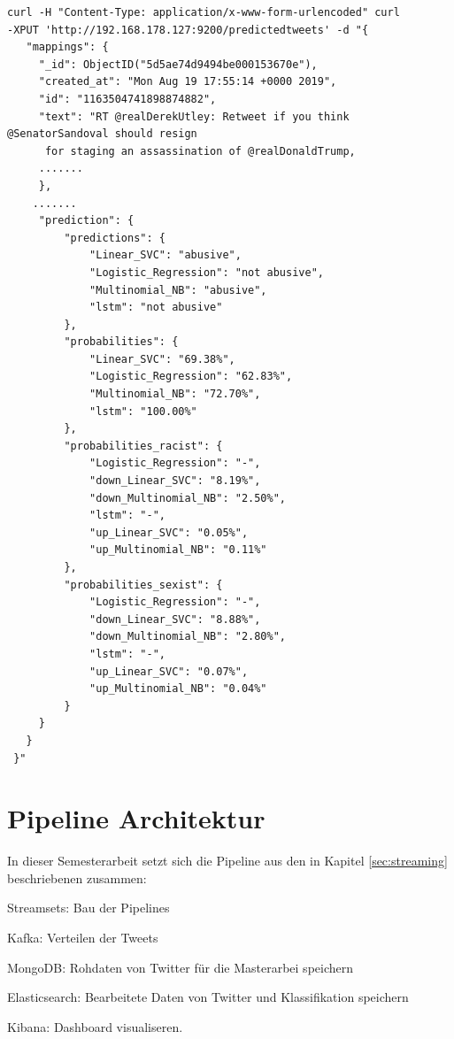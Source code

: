 \begin{lstlisting}[float=h,frame=tb,caption={Befehl ein Dokument in Elasticsearch einzufügen},label=lst:elastic_creat_doc]
curl -H "Content-Type: application/x-www-form-urlencoded" curl 
-XPUT 'http://192.168.178.127:9200/predictedtweets' -d "{
   "mappings": {
     "_id": ObjectID("5d5ae74d9494be000153670e"),
     "created_at": "Mon Aug 19 17:55:14 +0000 2019",
     "id": "1163504741898874882",
     "text": "RT @realDerekUtley: Retweet if you think @SenatorSandoval should resign
      for staging an assassination of @realDonaldTrump,
     .......
     },
   	.......
     "prediction": {
         "predictions": {
             "Linear_SVC": "abusive",
             "Logistic_Regression": "not abusive",
             "Multinomial_NB": "abusive",
             "lstm": "not abusive"
         },
         "probabilities": {
             "Linear_SVC": "69.38%",
             "Logistic_Regression": "62.83%",
             "Multinomial_NB": "72.70%",
             "lstm": "100.00%"
         },
         "probabilities_racist": {
             "Logistic_Regression": "-",
             "down_Linear_SVC": "8.19%",
             "down_Multinomial_NB": "2.50%",
             "lstm": "-",
             "up_Linear_SVC": "0.05%",
             "up_Multinomial_NB": "0.11%"
         },
         "probabilities_sexist": {
             "Logistic_Regression": "-",
             "down_Linear_SVC": "8.88%",
             "down_Multinomial_NB": "2.80%",
             "lstm": "-",
             "up_Linear_SVC": "0.07%",
             "up_Multinomial_NB": "0.04%"
         }
     }
   }
 }"
\end{lstlisting}


\section{Pipeline Architektur}
\label{sec:pipeline_architecture}
In dieser Semesterarbeit setzt sich die Pipeline aus den in Kapitel \ref{sec:streaming} beschriebenen zusammen: 

Streamsets: Bau der Pipelines

Kafka: Verteilen der Tweets

MongoDB: Rohdaten von Twitter für die Masterarbei speichern

Elasticsearch: Bearbeitete Daten von Twitter und Klassifikation speichern

Kibana: Dashboard visualiseren.

